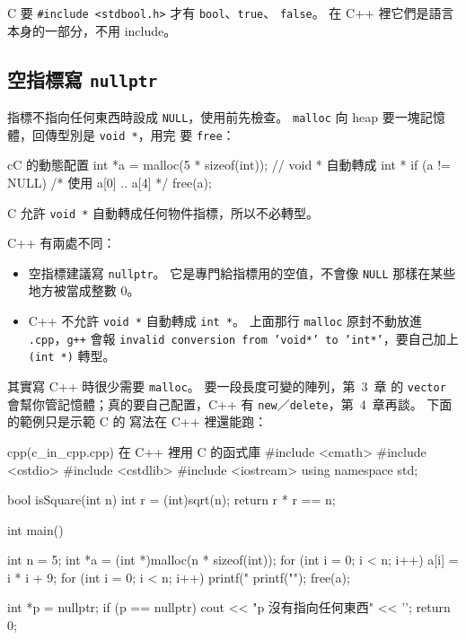 C 要 \texttt{\#include <stdbool.h>} 才有 \texttt{bool}、\texttt{true}、
\texttt{false}。 在 C++ 裡它們是語言本身的一部分，不用 include。

\subsection{空指標寫 \texttt{nullptr}}

\begin{crecap}
指標不指向任何東西時設成 \texttt{NULL}，使用前先檢查。
\texttt{malloc} 向 heap 要一塊記憶體，回傳型別是 \texttt{void *}，用完
要 \texttt{free}：

\begin{code}{c}{C 的動態配置}
int *a = malloc(5 * sizeof(int));   // void * 自動轉成 int *
if (a != NULL) {
    /* 使用 a[0] .. a[4] */
    free(a);
}
\end{code}

C 允許 \texttt{void *} 自動轉成任何物件指標，所以不必轉型。
\end{crecap}

C++ 有兩處不同：

\begin{itemize}
\item 空指標建議寫 \texttt{nullptr}。 它是專門給指標用的空值，不會像
\texttt{NULL} 那樣在某些地方被當成整數 $0$。
\item C++ 不允許 \texttt{void *} 自動轉成 \texttt{int *}。 上面那行
\texttt{malloc} 原封不動放進 \texttt{.cpp}，\texttt{g++} 會報
\texttt{invalid conversion from 'void*' to 'int*'}，要自己加上
\texttt{(int *)} 轉型。
\end{itemize}

其實寫 C++ 時很少需要 \texttt{malloc}。 要一段長度可變的陣列，第~3~章
的 \texttt{vector} 會幫你管記憶體；真的要自己配置，C++ 有
\texttt{new}／\texttt{delete}，第~4~章再談。 下面的範例只是示範 C 的
寫法在 C++ 裡還能跑：

\begin{example}[label=ex:c-in-cpp]{cpp}{(c\_in\_cpp.cpp) 在 C++ 裡用 C 的函式庫}
#include <cmath>
#include <cstdio>
#include <cstdlib>
#include <iostream>
using namespace std;

bool isSquare(int n) {
    int r = (int)sqrt(n);
    return r * r == n;
}

int main() {
    int n = 5;
    int *a = (int *)malloc(n * sizeof(int));
    for (int i = 0; i < n; i++) {
        a[i] = i * i + 9;
    }
    for (int i = 0; i < n; i++) {
        printf("%
    }
    printf("\n");
    free(a);

    int *p = nullptr;
    if (p == nullptr) {
        cout << "p 沒有指向任何東西" << '\n';
    }
    return 0;
}
\end{example}

